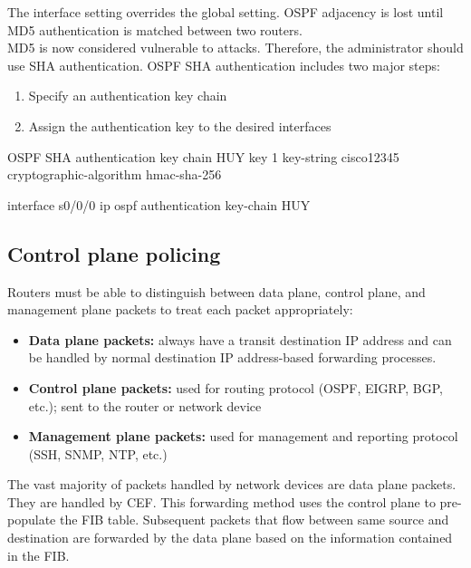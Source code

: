 \note The interface setting overrides the global setting. OSPF adjacency is lost until MD5 authentication is matched between two routers.\\

MD5 is now considered vulnerable to attacks. Therefore, the administrator should use SHA authentication. OSPF SHA authentication includes two major steps:

\begin{enumerate}
\item Specify an authentication key chain
\item Assign the authentication key to the desired interfaces 
\end{enumerate}

\begin{sexylisting}{OSPF SHA authentication}
key chain HUY
  key 1
  key-string cisco12345
  cryptographic-algorithm hmac-sha-256
  
interface s0/0/0
  ip ospf authentication key-chain HUY
\end{sexylisting}

\subsection{Control plane policing}

Routers must be able to distinguish between data plane, control plane, and management plane packets to treat each packet appropriately:

\begin{itemize}
\item \textbf{Data plane packets:} always have a transit destination IP address and can be handled by normal destination IP address-based forwarding processes.
\item \textbf{Control plane packets:} used for routing protocol (OSPF, EIGRP, BGP, etc.); sent to the router or network device
\item \textbf{Management plane packets:} used for management and reporting protocol (SSH, SNMP, NTP, etc.)
\end{itemize}

The vast majority of packets handled by network devices are data plane packets. They are handled by CEF. This forwarding method uses the control plane to pre-populate the FIB table. Subsequent packets that flow between same source and destination are forwarded by the data plane based on the information contained in the FIB.
%
